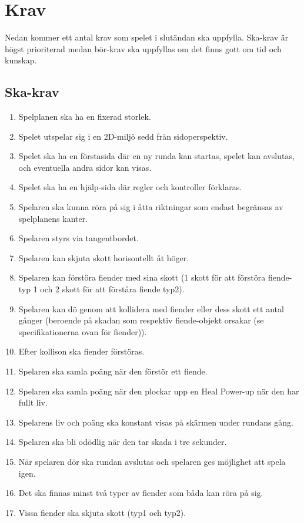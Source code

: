 \documentclass{TDP005mall}
\begin{document}
\section{Krav}
Nedan kommer ett antal krav som spelet i slutändan ska uppfylla. Ska-krav är högst prioriterad medan bör-krav ska uppfyllas om det finns gott om tid och kunskap.

\subsection{Ska-krav}
\begin{enumerate}
\item Spelplanen ska ha en fixerad storlek.
\item Spelet utspelar sig i en 2D-miljö sedd från sidoperspektiv.
\item Spelet ska ha en förstasida där en ny runda kan startas, spelet kan avslutas, och eventuella andra sidor kan visas.
\item Spelet ska ha en hjälp-sida där regler och kontroller förklaras.
\item Spelaren ska kunna röra på sig i åtta riktningar som endast begränsas av spelplanens kanter.
\item Spelaren styrs via tangentbordet.
\item Spelaren kan skjuta skott horisontellt åt höger.
\item Spelaren kan förstöra fiender med sina skott (1 skott för att förstöra fiende-typ 1 och 2 skott för att förståra fiende typ2).
\item Spelaren kan dö genom att kollidera med fiender eller dess skott ett antal gånger (beroende på skadan som respektiv fiende-objekt orsakar (se specifikationerna ovan för fiender)).
\item Efter kollison ska fiender förstöras.
\item Spelaren ska samla poäng när den förstör ett fiende.
\item Spelaren ska samla poäng när den plockar upp en Heal Power-up när den har fullt liv.
\item Spelarens liv och poäng ska konstant visas på skärmen under rundans gång.
\item Spelaren ska bli odödlig när den tar skada i tre sekunder.
\item När spelaren dör ska rundan avslutas och spelaren ges möjlighet att spela igen.
\item Det ska finnas minst två typer av fiender som båda kan röra på sig.
\item Vissa fiender ska skjuta skott (typ1 och typ2).

\end{enumerate}
\end{document}
